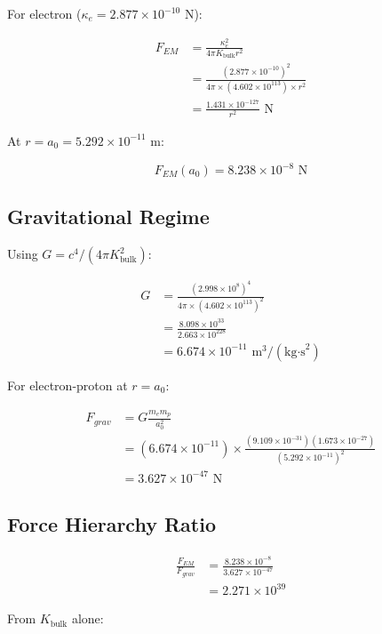 \documentclass{article}
\begin{document}
For electron ($\kappa_e = 2.877 \times 10^{-10}$ N):

\begin{align}
F_{EM} &= \frac{\kappa_e^2}{4\pi K_{\text{bulk}} r^2} \\
&= \frac{(2.877 \times 10^{-10})^2}{4\pi \times (4.602 \times 10^{113}) \times r^2} \\
&= \frac{1.431 \times 10^{-127}}{r^2} \text{ N}
\end{align}

At $r = a_0 = 5.292 \times 10^{-11}$ m:

\begin{equation}
F_{EM}(a_0) = 8.238 \times 10^{-8} \text{ N}
\end{equation}

\subsection{Gravitational Regime}

Using $G = c^4/(4\pi K_{\text{bulk}}^2)$:

\begin{align}
G &= \frac{(2.998 \times 10^8)^4}{4\pi \times (4.602 \times 10^{113})^2} \\
&= \frac{8.098 \times 10^{33}}{2.663 \times 10^{228}} \\
&= 6.674 \times 10^{-11} \text{ m}^3/(\text{kg·s}^2)
\end{align}

For electron-proton at $r = a_0$:

\begin{align}
F_{grav} &= G \frac{m_e m_p}{a_0^2} \\
&= (6.674 \times 10^{-11}) \times \frac{(9.109 \times 10^{-31})(1.673 \times 10^{-27})}{(5.292 \times 10^{-11})^2} \\
&= 3.627 \times 10^{-47} \text{ N}
\end{align}

\subsection{Force Hierarchy Ratio}

\begin{align}
\frac{F_{EM}}{F_{grav}} &= \frac{8.238 \times 10^{-8}}{3.627 \times 10^{-47}} \\
&= 2.271 \times 10^{39}
\end{align}

From $K_{\text{bulk}}$ alone:
\end{document}
